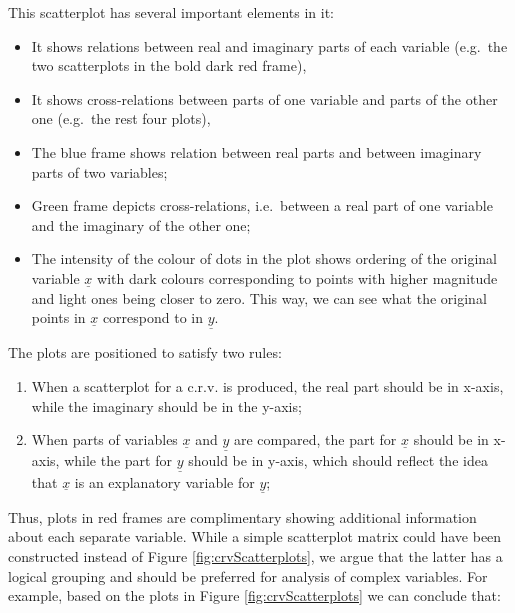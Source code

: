 \documentclass[
]{book}
\providecommand{\tightlist}{%
  \setlength{\itemsep}{0pt}\setlength{\parskip}{0pt}}
\begin{document}
This scatterplot has several important elements in it:

\begin{itemize}
\tightlist
\item
  It shows relations between real and imaginary parts of each variable (e.g.~the two scatterplots in the bold dark red frame),
\item
  It shows cross-relations between parts of one variable and parts of the other one (e.g.~the rest four plots),
\item
  The blue frame shows relation between real parts and between imaginary parts of two variables;
\item
  Green frame depicts cross-relations, i.e.~between a real part of one variable and the imaginary of the other one;
\item
  The intensity of the colour of dots in the plot shows ordering of the original variable \(\underline{x}\) with dark colours corresponding to points with higher magnitude and light ones being closer to zero. This way, we can see what the original points in \(\underline{x}\) correspond to in \(\underline{y}\).
\end{itemize}

The plots are positioned to satisfy two rules:

\begin{enumerate}
\def\labelenumi{\arabic{enumi}.}
\tightlist
\item
  When a scatterplot for a c.r.v. is produced, the real part should be in x-axis, while the imaginary should be in the y-axis;
\item
  When parts of variables \(\underline{x}\) and \(\underline{y}\) are compared, the part for \(\underline{x}\) should be in x-axis, while the part for \(\underline{y}\) should be in y-axis, which should reflect the idea that \(\underline{x}\) is an explanatory variable for \(\underline{y}\);
\end{enumerate}

Thus, plots in red frames are complimentary showing additional information about each separate variable. While a simple scatterplot matrix could have been constructed instead of Figure \ref{fig:crvScatterplots}, we argue that the latter has a logical grouping and should be preferred for analysis of complex variables. For example, based on the plots in Figure \ref{fig:crvScatterplots} we can conclude that:
\end{document}
